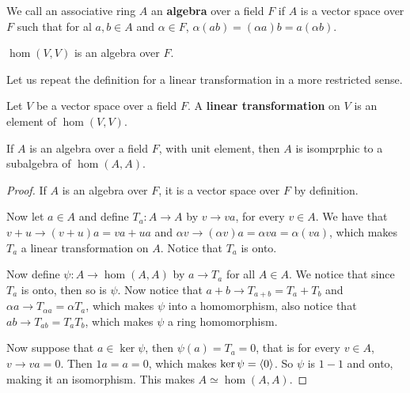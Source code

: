 \begin{definition}
    We call an associative ring $A$ an  \textbf{algebra} over a field $F$ if
    $A$ is a vector space over  $F$ such that for al  $a,b \in A$ and  $\alpha
    \in F$,  $\alpha(ab)=(\alpha a)b=a(\alpha b)$.
\end{definition}

\begin{example}
    $\hom{(V,V)}$ is an algebra over $F$.
\end{example} 

Let us repeat the definition for a linear transformation in a more restricted
sense.

\begin{definition}
    Let $V$ be a vector space over a field  $F$. A  \textbf{linear
    transformation} on $V$ is an element of  $\hom{(V,V)}$.
\end{definition}

\begin{lemma}\label{3.1.2}
    If $A$ is an algebra over a field  $F$, with unit element, then  $A$ is
    isomprphic to  a subalgebra of  $\hom{(A,A)}$.
\end{lemma}
\begin{proof}
    If $A$ is an algebra over  $F$, it is a vector space over  $F$ by
    definition.
    
    Now let  $a \in A$ and define  $T_a:A \rightarrow A$ by $v \rightarrow va$,
    for every $v \in A$. We have that  $v+u \rightarrow (v+u)a=va+ua$ and
    $\alpha v \rightarrow (\alpha v)a = \alpha va=\alpha(va)$, which makes $T_a$
    a linear transformation on  $A$. Notice that  $T_a$ is onto.

    Now define  $\psi:A \rightarrow \hom{(A,A)}$ by $a \rightarrow T_a$ for all
    $A \in A$. We notice that since  $T_a$ is onto, then so is  $\psi$. Now
    notice that  $a+b \rightarrow T_{a+b}=T_a+T_b$ and $\alpha a \rightarrow
    T_{\alpha a}=\alpha T_a$, which makes $\psi$ into a homomorphism, also
    notice that  $ab \rightarrow T_{ab}=T_aT_b$, which makes $\psi$ a ring
    homomorphism.

    Now suppose that  $a \in \ker{\psi}$, then $\psi(a)=T_a=0$, that is for
    every $v \in A$,  $v \rightarrow va=0$. Then $1a=a=0$, which makes
    $\ker{\psi}=\langle 0\rangle$. So $\psi$ is  $1-1$ and onto, making it an
    isomorphism. This makes  $A \simeq \hom{(A,A)}$.
\end{proof}

